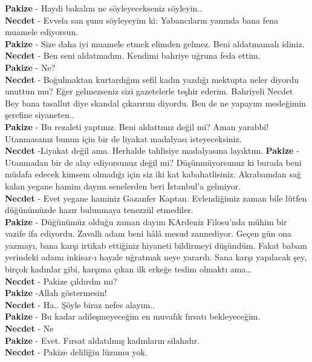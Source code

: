 \documentclass[]{book}
\begin{document}
\textbf{Pakize} - Haydi bakalım ne söyleyecekseniz söyleyin..\\
\textbf{Necdet} - Evvela san şunu söyleyeyim ki: Yabancıların yanında bana fena muamele ediyorsun.\\
\textbf{Pakize} - Size daha iyi muamele etmek elimden gelmez. Beni aldatmamalı idiniz.\\
\textbf{Necdet} - Ben seni aldatmadım. Kendimi bahriye uğruna feda ettim.\\
\textbf{Pakize} - Ne?\\
\textbf{Necdet} - Boğulmaktan kurtardığım sefil kadın yazdığı mektupta neler diyordu unuttun mu? Eğer gelmezseniz sizi gazetelerle teşhir ederim. Bahriyeli Necdet Bey bana tasallut diye skandal çıkarırım diyordu. Ben de ne yapayım mesleğimin şerefine siyaneten..\\
\textbf{Pakize} - Bu rezaleti yaptınız. Beni aldattınız değil mi? Aman yarabbi! Utanmasanız bunun için bir de liyakat madalyası isteyeceksiniz.\\
\textbf{Necdet} -Liyakat değil ama. Herhalde tahlisiye madalyasına layıktım.
\textbf{Pakize} - Utanmadan bir de alay ediyorsunuz değil mi? Düşünmüyorsunuz ki burada beni müdafa edecek kimsem olmadığı için siz iki kat kabahatlisiniz. Akrabamdan sağ kalan yegane hamim dayım senelerden beri İstanbul'a gelmiyor.\\
\textbf{Necdet} - Evet yegane haminiz Gazanfer Kaptan. Evlendiğimiz zaman bile lütfen düğünümüzde hazır bulunmaya tenezzül etmediler.\\
\textbf{Pakize} - Düğünümüz olduğu zaman dayım KArdeniz Filosu'nda
mühim bir vazife ifa ediyordu. Zavallı adam beni hâlâ mesud zannediyor. Geçen gün ona yazmayı, bana karşı irtikab ettiğiniz hiyaneti bildirmeyi düşündüm. Fakat babam yerindeki adamı inkisar-ı hayale uğratmak neye yarardı. Sana karşı yapılacak şey, birçok kadınlar gibi, karşıma çıkan ilk erkeğe teslim olmaktı ama\ldots{}\\
\textbf{Necdet} - Pakize çıldırdın mı?\\
\textbf{Pakize} -Allah göstermesin!\\
\textbf{Necdet} - Ha.. Şöyle biraz nefes alayım..\\
\textbf{Pakize} - Bu kadar adileşmeyeceğim en muvafık fırsatı bekleyeceğim.\\
\textbf{Necdet} - Ne\\
\textbf{Pakize} - Evet. Fırsat aldatılmış kadınların silahıdır.\\
\textbf{Necdet} - Pakize deliliğin lüzumu yok.\\
\end{document}
